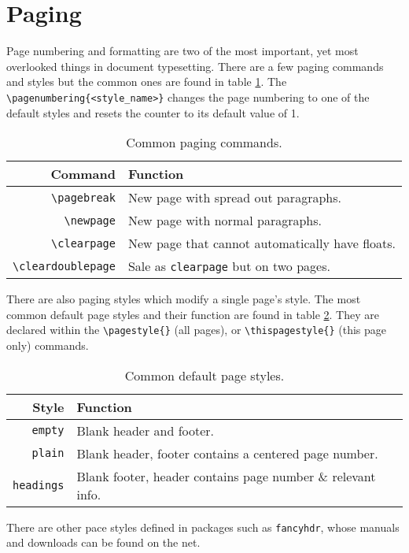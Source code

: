 \section{Paging}
%
Page numbering and formatting are two of the most important, yet most overlooked things in document typesetting. There are a few paging commands and styles but the common ones are found in table \ref{t:page}. The \verb|\pagenumbering{<style_name>}| changes the page numbering to one of the default styles and resets the counter to its default value of 1.
\begin{table}[!htbp]
    \centering
    \caption{Common paging commands.}
    \label{t:page}
    \begin{tabular}{rl}
        \toprule
        Command & Function \\
        \midrule
        \verb|\pagebreak| & New page with spread out paragraphs. \\
        \verb|\newpage| & New page with normal paragraphs. \\
        \verb|\clearpage| & New page that cannot automatically have floats. \\
        \verb|\cleardoublepage| & Sale as \verb|clearpage| but on two pages. \\
        \bottomrule
    \end{tabular}
\end{table}

There are also paging styles which modify a single page's style. The most common default page styles and their function are found in table \ref{t:pagestyle}. They are declared within the \verb|\pagestyle{}| (all pages), or \verb|\thispagestyle{}| (this page only) commands.
\begin{table}[!htbp]
    \centering
    \caption{Common default page styles.}
    \label{t:pagestyle}
    \begin{tabular}{rl}
        \toprule
        Style & Function \\
        \midrule
        \verb|empty| & Blank header and footer. \\
        \verb|plain| & Blank header, footer contains a centered page number.\\
        \verb|headings| & Blank footer, header contains page number \& relevant info. \\
        \bottomrule
    \end{tabular}
\end{table}

There are other pace styles defined in packages such as \verb|fancyhdr|, whose manuals and downloads can be found on the net.
%
